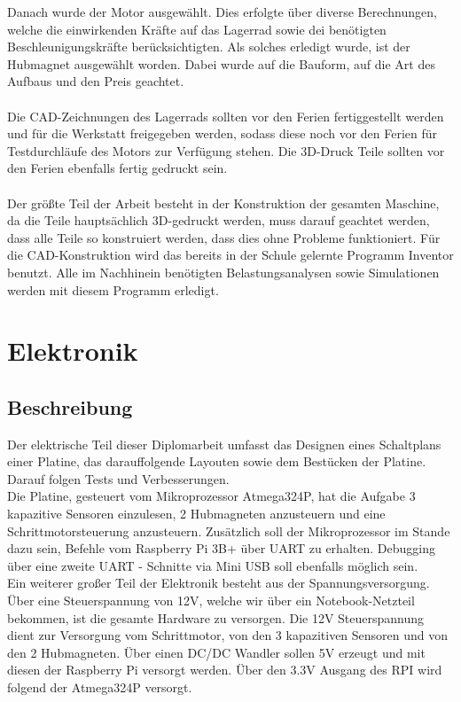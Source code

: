 Danach wurde der Motor ausgewählt. Dies erfolgte über diverse Berechnungen, welche die einwirkenden Kräfte auf das Lagerrad sowie dei benötigten Beschleunigungskräfte berücksichtigten.
Als solches erledigt wurde, ist der Hubmagnet ausgewählt worden. Dabei wurde auf die Bauform, auf die Art des Aufbaus und den Preis geachtet.
\\\\
Die CAD-Zeichnungen des Lagerrads sollten vor den Ferien fertiggestellt werden und für die Werkstatt freigegeben werden, sodass diese noch vor den Ferien für Testdurchläufe des Motors zur Verfügung stehen.
Die 3D-Druck Teile sollten vor den Ferien ebenfalls fertig gedruckt sein.
\\\\
Der größte Teil der Arbeit besteht in der Konstruktion der gesamten Maschine, da die Teile hauptsächlich 3D-gedruckt werden, muss darauf geachtet werden, dass alle Teile so konstruiert werden, dass dies ohne Probleme funktioniert.
Für die CAD-Konstruktion wird das bereits in der Schule gelernte Programm Inventor benutzt. Alle im Nachhinein benötigten Belastungsanalysen sowie Simulationen werden mit diesem Programm erledigt.


\chapter{Elektronik}
\label{sec:Elektronik}
\section{Beschreibung}

Der elektrische Teil dieser Diplomarbeit umfasst das Designen eines Schaltplans einer Platine, das darauffolgende Layouten sowie dem Bestücken der Platine. Darauf folgen Tests und Verbesserungen.\\

Die Platine, gesteuert vom Mikroprozessor Atmega324P, hat die Aufgabe 3 kapazitive Sensoren einzulesen, 2 Hubmagneten anzusteuern und eine Schrittmotorsteuerung anzusteuern.
Zusätzlich soll der Mikroprozessor im Stande dazu sein, Befehle vom Raspberry Pi 3B+ über UART zu erhalten. Debugging über eine zweite UART - Schnitte via Mini USB soll ebenfalls möglich sein. \\

Ein weiterer großer Teil der Elektronik besteht aus der Spannungsversorgung. Über eine Steuerspannung von 12V, welche wir über ein Notebook-Netzteil bekommen, ist die gesamte Hardware zu versorgen.
Die 12V Steuerspannung dient zur Versorgung vom Schrittmotor, von den 3 kapazitiven Sensoren und von den 2 Hubmagneten. Über einen DC/DC Wandler sollen 5V erzeugt und mit diesen der Raspberry Pi versorgt werden.
Über den 3.3V Ausgang des RPI wird folgend der Atmega324P versorgt.


